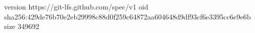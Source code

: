 version https://git-lfs.github.com/spec/v1
oid sha256:429de76b70e2eb29998c88d0f259c64872aa604648d9df93cf6e3395cc6e9e6b
size 349692
